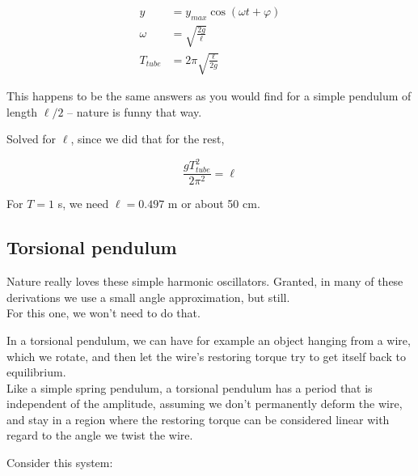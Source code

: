 \begin{align}
y &= y_{max} \cos(\omega t + \varphi)\\
\omega &= \sqrt{\frac{2 g}{\ell}}\\
T_{tube} &= 2 \pi \sqrt{\frac{\ell}{2 g}}
\end{align}

This happens to be the same answers as you would find for a simple pendulum of length $\ell/2$ -- nature is funny that way.

Solved for $\ell$, since we did that for the rest,

\begin{equation}
\frac{g T_{tube}^2}{2 \pi^2} = \ell
\end{equation}

For $T = 1$ s, we need $\ell = 0.497$ m or about 50 cm.

\subsection{Torsional pendulum}

Nature really loves these simple harmonic oscillators. Granted, in many of these derivations we use a small angle approximation, but still.\\
For this one, we won't need to do that.

In a torsional pendulum, we can have for example an object hanging from a wire, which we rotate, and then let the wire's restoring torque try to get itself back to equilibrium.\\
Like a simple spring pendulum, a torsional pendulum has a period that is independent of the amplitude, assuming we don't permanently deform the wire, and stay in a region where the restoring torque can be considered linear with regard to the angle we twist the wire.

Consider this system:

\begin{figure}[H]
\centering
{}
\end{figure}


